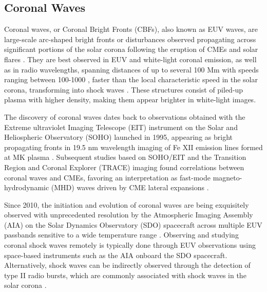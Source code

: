 \subsection{Coronal Waves}
Coronal waves, or Coronal Bright Fronts (CBFs), also known as EUV waves, are large-scale arc-shaped bright fronts or disturbances observed propagating across significant portions of the solar corona following the eruption of CMEs and solar flares \citep{thompson_1998, nindos_2008, vrsnak_2008, magdalenic_2010, veronig_2010, warmuth_2015}. They are best observed in EUV and white-light coronal emission, as well as in radio wavelengths, spanning distances of up to several 100 Mm with speeds ranging between 100-1000 \kms, faster than the local characteristic speed in the solar corona, transforming into shock waves \citep{pick_2006, thompson_2009, nitta_2013, liu_2014}. These structures consist of piled-up plasma with higher density, making them appear brighter in white-light images.

The discovery of coronal waves dates back to observations obtained with the Extreme ultraviolet Imaging Telescope (EIT) instrument on the Solar and Heliospheric Observatory (SOHO) launched in 1995, appearing as bright propagating fronts in 19.5 nm wavelength imaging of Fe XII emission lines formed at  MK plasma \citep{thompson_1998}. Subsequent studies based on SOHO/EIT and the Transition Region and Coronal Explorer (TRACE) imaging found correlations between coronal waves and CMEs, favoring an interpretation as fast-mode magneto-hydrodynamic (MHD) waves driven by CME lateral expansions \citep{biesecker_2002}.

Since 2010, the initiation and evolution of coronal waves are being exquisitely observed with unprecedented resolution by the Atmospheric Imaging Assembly (AIA) on the Solar Dynamics Observatory (SDO) spacecraft \citep{lemen_2012} across multiple EUV passbands sensitive to a wide temperature range \citep{nitta_2013}.
Observing and studying coronal shock waves remotely is typically done through EUV observations using space-based instruments such as the AIA onboard the SDO spacecraft. Alternatively, shock waves can be indirectly observed through the detection of type II radio bursts, which are commonly associated with shock waves in the solar corona \citep{vrsnak_2008}.

